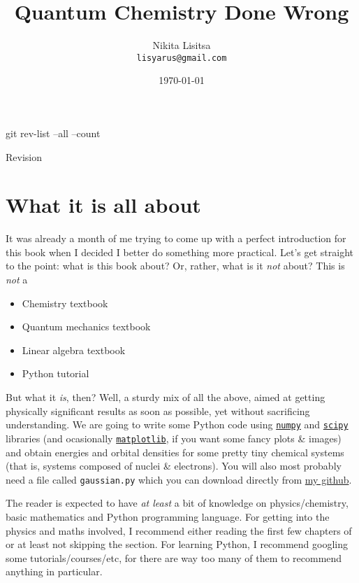 \documentclass{article}
\begin{document}
\title{Quantum Chemistry Done Wrong}
\author{Nikita Lisitsa \\ \texttt{lisyarus@gmail.com}}
\date{\today}

\maketitle

\bash
git rev-list --all --count
\END
\centerline{Revision \bashStdout}

\newpage

\tableofcontents

\newpage

\section{What it is all about}

It was already a month of me trying to come up with a perfect introduction for this book when I decided I better do something more practical. Let's get straight to the point: what is this book about? Or, rather, what is it \textit{not} about? This is \textit{not} a

\begin{itemize}
\item Chemistry textbook
\item Quantum mechanics textbook
\item Linear algebra textbook
\item Python tutorial
\end{itemize}

But what it \textit{is}, then? Well, a sturdy mix of all the above, aimed at getting physically significant results as soon as possible, yet without sacrificing understanding. We are going to write some Python code using \href{https://numpy.org}{\texttt{numpy}} and \href{https://www.scipy.org}{\texttt{scipy}} libraries (and ocasionally \href{https://matplotlib.org}{\texttt{matplotlib}}, if you want some fancy plots \& images) and obtain energies and orbital densities for some pretty tiny chemical systems (that is, systems composed of nuclei \& electrons). You will also most probably need a file called \texttt{gaussian.py} which you can download directly from \href{https://raw.githubusercontent.com/lisyarus/qchem/master/gaussian.py}{my github}.

The reader is expected to have \textit{at least} a bit of knowledge on physics/chemistry, basic mathematics and Python programming language. For getting into the physics and maths involved, I recommend either reading the first few chapters of \cite{ref:atkins} or at least not skipping the  section. For learning Python, I recommend googling some tutorials/courses/etc, for there are way too many of them to recommend anything in particular.
\end{document}
